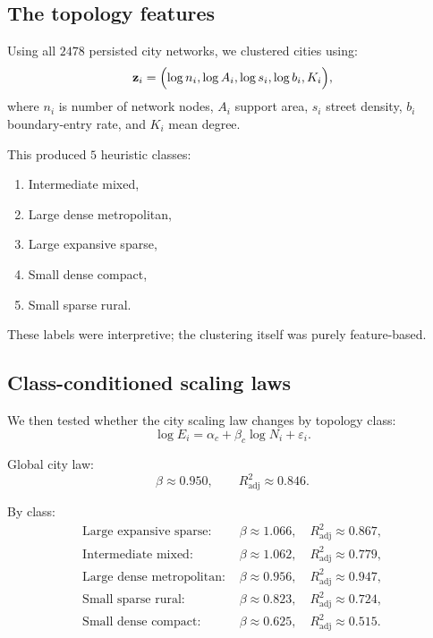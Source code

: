 \documentclass[11pt]{article}
\newcommand{\adjR}{R^2_{\mathrm{adj}}}
\begin{document}
\subsection{The topology features}

Using all \(2478\) persisted city networks, we clustered cities using:
\begin{equation}
\mathbf{z}_i =
\Bigl(
\log n_i,
\log A_i,
\log s_i,
\log b_i,
K_i
\Bigr),
\end{equation}
where \(n_i\) is number of network nodes, \(A_i\) support area, \(s_i\) street density, \(b_i\) boundary-entry rate, and \(K_i\) mean degree.

This produced \(5\) heuristic classes:
\begin{enumerate}[label=\arabic*.,leftmargin=2.0em]
\item Intermediate mixed,
\item Large dense metropolitan,
\item Large expansive sparse,
\item Small dense compact,
\item Small sparse rural.
\end{enumerate}

These labels were interpretive; the clustering itself was purely feature-based.

\subsection{Class-conditioned scaling laws}

We then tested whether the city scaling law changes by topology class:
\begin{equation}
\log E_i = \alpha_c + \beta_c \log N_i + \varepsilon_i.
\end{equation}

Global city law:
\begin{equation}
\beta \approx 0.950,
\qquad
\adjR \approx 0.846.
\end{equation}

By class:
\begin{align}
\text{Large expansive sparse: } & \beta \approx 1.066,\quad \adjR \approx 0.867,\\
\text{Intermediate mixed: } & \beta \approx 1.062,\quad \adjR \approx 0.779,\\
\text{Large dense metropolitan: } & \beta \approx 0.956,\quad \adjR \approx 0.947,\\
\text{Small sparse rural: } & \beta \approx 0.823,\quad \adjR \approx 0.724,\\
\text{Small dense compact: } & \beta \approx 0.625,\quad \adjR \approx 0.515.
\end{align}
\end{document}
